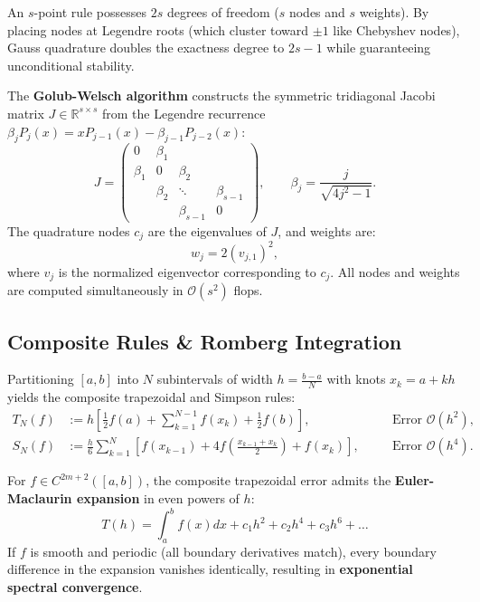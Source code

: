 An $s$-point rule possesses $2s$ degrees of freedom ($s$ nodes and $s$ weights). By placing nodes at Legendre roots (which cluster toward $\pm 1$ like Chebyshev nodes), Gauss quadrature doubles the exactness degree to $2s - 1$ while guaranteeing unconditional stability.

\begin{theorem}
    The \textbf{Golub-Welsch algorithm} constructs the symmetric tridiagonal Jacobi matrix $J \in \mathbb{R}^{s \times s}$ from the Legendre recurrence $\beta_j P_j(x) = x P_{j-1}(x) - \beta_{j-1} P_{j-2}(x)$:
    \begin{equation}
        J = \begin{pmatrix}
            0 & \beta_1 & & \\
            \beta_1 & 0 & \beta_2 & \\
            & \beta_2 & \ddots & \beta_{s-1} \\
            & & \beta_{s-1} & 0
        \end{pmatrix}, \qquad \beta_j = \frac{j}{\sqrt{4j^2 - 1}}.
    \end{equation}
    The quadrature nodes $c_j$ are the eigenvalues of $J$, and weights are:
    \begin{equation}
        w_j = 2 (v_{j,1})^2,
    \end{equation}
    where $v_j$ is the normalized eigenvector corresponding to $c_j$. All nodes and weights are computed simultaneously in $\mathcal{O}(s^2)$ flops.
\end{theorem}

\subsection{Composite Rules \& Romberg Integration}

Partitioning $[a, b]$ into $N$ subintervals of width $h = \frac{b-a}{N}$ with knots $x_k = a + k h$ yields the composite trapezoidal and Simpson rules:
\begin{align}
    T_N(f) &:= h \left[ \frac{1}{2}f(a) + \sum_{k=1}^{N-1} f(x_k) + \frac{1}{2}f(b) \right], \quad &&\text{Error } \mathcal{O}(h^2), \\
    S_N(f) &:= \frac{h}{6} \sum_{k=1}^{N} \left[ f(x_{k-1}) + 4 f\left(\frac{x_{k-1}+x_k}{2}\right) + f(x_k) \right], \quad &&\text{Error } \mathcal{O}(h^4).
\end{align}

For $f \in C^{2m+2}([a, b])$, the composite trapezoidal error admits the \textbf{Euler-Maclaurin expansion} in even powers of $h$:
\begin{equation}
    T(h) = \int_{a}^{b} f(x) dx + c_1 h^2 + c_2 h^4 + c_3 h^6 + \dots
\end{equation}
If $f$ is smooth and periodic (all boundary derivatives match), every boundary difference in the expansion vanishes identically, resulting in \textbf{exponential spectral convergence}.

